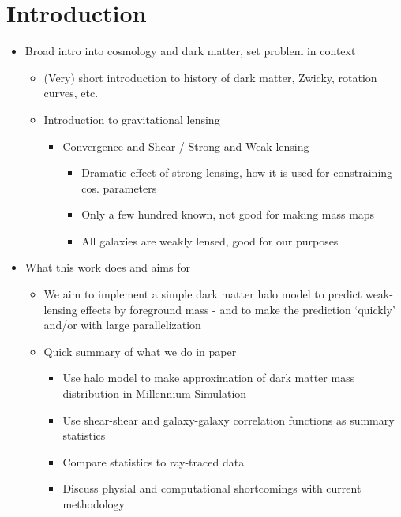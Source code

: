 \documentclass[%
 reprint,
 amsmath,amssymb,
 aps,
]{revtex4-1}
\begin{document}

\section{Introduction}

\begin{itemize}
\item Broad intro into cosmology and dark matter, set problem in context
    \begin{itemize}
    \item (Very) short introduction to history of dark matter, Zwicky, rotation curves, etc.
    \end{itemize}
\begin{itemize}
\item Introduction to gravitational lensing
    \begin{itemize}
    \item Convergence and Shear / Strong and Weak lensing
        \begin{itemize}
        \item Dramatic effect of strong lensing, how it is used for constraining cos. parameters
        \item Only a few hundred known, not good for making mass maps
        \item All galaxies are weakly lensed, good for our purposes
        \end{itemize}
    \end{itemize}
\end{itemize}
\item What this work does and aims for
\begin{itemize}
    \item We aim to implement a simple dark matter halo model to predict weak-lensing effects by foreground mass - and to make the prediction `quickly' and/or with large parallelization
    \item Quick summary of what we do in paper
        \begin{itemize}
        \item Use halo model to make approximation of dark matter mass distribution in Millennium Simulation
        \item Use shear-shear and galaxy-galaxy correlation functions as summary statistics
        \item Compare statistics to ray-traced data
        \item Discuss physial and computational shortcomings with current methodology
        \end{itemize}
    \end{itemize}
\end{itemize}
\end{document}
